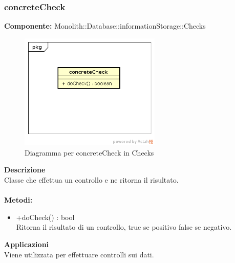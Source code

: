 \subsubsection{concreteCheck}
\textbf{Componente:}  Monolith::Database::informationStorage::Checks\\
   \FloatBarrier
   \begin{figure}[ht]
   \centering
   \includegraphics[width=0.6\textwidth]{img/single-concreteCheck}
   \caption{{Diagramma per concreteCheck in Checks}}
\end{figure}
\FloatBarrier
\textbf{Descrizione}\\
Classe che effettua un controllo e ne ritorna il risultato. \\\\
\textbf{Metodi:} \begin{itemize} \item +doCheck() : bool \\Ritorna il risultato di un controllo, true se positivo false se negativo.\end{itemize} 


\textbf{Applicazioni}\\
Viene utilizzata per effettuare controlli sui dati. 


\clearpage

